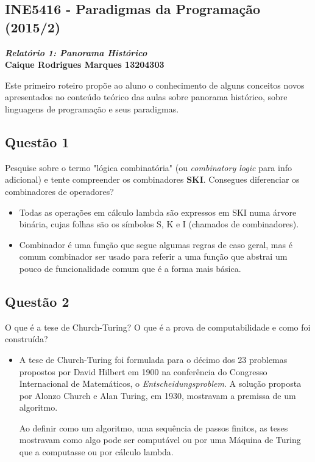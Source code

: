 \documentclass{article}
\begin{document}
\begin{center}
    \section*{INE5416 - Paradigmas da Programação (2015/2)}
    \textbf{\textit{Relatório 1: Panorama Histórico} \\
    Caique Rodrigues Marques 13204303}
\end{center}
Este primeiro roteiro propõe ao aluno o conhecimento de alguns conceitos novos
apresentados no conteúdo teórico das aulas sobre panorama histórico, sobre
linguagens de programação e seus paradigmas.
\subsection*{Questão 1}
Pesquise sobre o termo "lógica combinatória" (ou \textit{combinatory logic}
para info adicional) e tente compreender os combinadores \textbf{SKI}.
Consegues diferenciar os combinadores de operadores?
        \begin{itemize}
        \item Todas as operações em cálculo lambda são expressos em SKI numa
            árvore binária, cujas folhas são os símbolos S, K e I (chamados de
                combinadores).
        \end{itemize}
        
        \begin{itemize}
        \item Combinador é uma função que segue algumas regras de caso geral,
            mas é comum combinador ser usado para referir a uma função que
                abstrai um pouco de funcionalidade comum que é a forma mais
                básica.
        \end{itemize}

\subsection*{Questão 2} 
O que é a tese de Church-Turing? O que é a prova de computabilidade e como foi
construída?
        \begin{itemize}
        \item A tese de Church-Turing foi formulada para o décimo dos 23
            problemas propostos por David Hilbert em 1900 na conferência do
                Congresso Internacional de Matemáticos, o
                \textit{Entscheidungsproblem}. A solução proposta por Alonzo
                Church e Alan Turing, em 1930, mostravam a premissa de um
                algoritmo. \par

Ao definir como um algoritmo, uma sequência de passos finitos, as teses
                mostravam como algo pode ser computável ou por uma Máquina de
                Turing que a computasse ou por cálculo lambda.
        \end{itemize}
\end{document}
